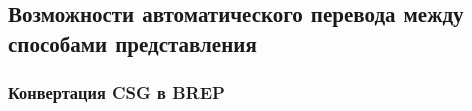 


%                                                                             

\subsection{Возможности автоматического перевода между способами представления}\label{sec:secAutoConversion}


\subsubsection{Конвертация CSG в BREP}\label{sec:secCSGtoBREP}


